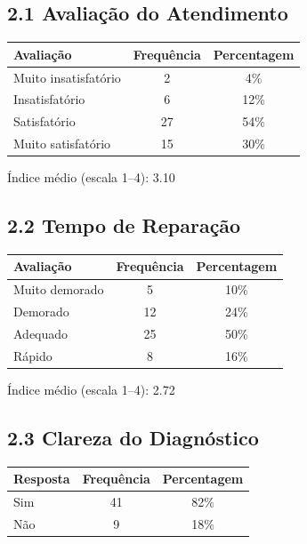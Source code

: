 \documentclass[11pt,a4paper]{article}
\begin{document}
\subsection*{2.1 Avaliação do Atendimento}

\begin{tabular}{lcc}
\toprule
\rowcolor{gray!10}
\textbf{Avaliação} & \textbf{Frequência} & \textbf{Percentagem} \\
\midrule
Muito insatisfatório & 2 & 4\% \\
Insatisfatório & 6 & 12\% \\
Satisfatório & 27 & 54\% \\
Muito satisfatório & 15 & 30\% \\
\bottomrule
\end{tabular}

\vspace{0.3cm}
Índice médio (escala 1–4): 3.10

\vspace{0.6cm}

\subsection*{2.2 Tempo de Reparação}

\begin{tabular}{lcc}
\toprule
\rowcolor{gray!10}
\textbf{Avaliação} & \textbf{Frequência} & \textbf{Percentagem} \\
\midrule
Muito demorado & 5 & 10\% \\
Demorado & 12 & 24\% \\
Adequado & 25 & 50\% \\
Rápido & 8 & 16\% \\
\bottomrule
\end{tabular}

\vspace{0.3cm}
Índice médio (escala 1–4): 2.72

\vspace{0.6cm}

\subsection*{2.3 Clareza do Diagnóstico}

\begin{tabular}{lcc}
\toprule
\rowcolor{gray!10}
\textbf{Resposta} & \textbf{Frequência} & \textbf{Percentagem} \\
\midrule
Sim & 41 & 82\% \\
Não & 9 & 18\% \\
\bottomrule
\end{tabular}
\end{document}
